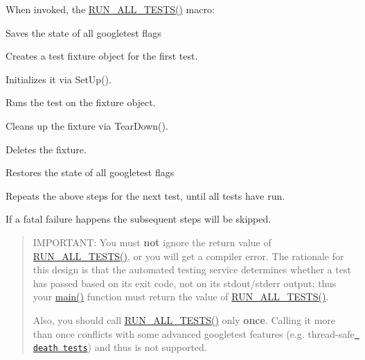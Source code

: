 When invoked, the {\ttfamily \mbox{\hyperlink{googletest-master_2googletest_2include_2gtest_2gtest_8h_a853a3792807489591d3d4a2f2ff9359f}{R\+U\+N\+\_\+\+A\+L\+L\+\_\+\+T\+E\+S\+T\+S()}}} macro\+:


\begin{DoxyEnumerate}
\item Saves the state of all googletest flags
\end{DoxyEnumerate}
\begin{DoxyItemize}
\item Creates a test fixture object for the first test.
\item Initializes it via {\ttfamily Set\+Up()}.
\item Runs the test on the fixture object.
\item Cleans up the fixture via {\ttfamily Tear\+Down()}.
\item Deletes the fixture.
\item Restores the state of all googletest flags
\item Repeats the above steps for the next test, until all tests have run.
\end{DoxyItemize}

If a fatal failure happens the subsequent steps will be skipped.

\begin{quote}
I\+M\+P\+O\+R\+T\+A\+NT\+: You must {\bfseries{not}} ignore the return value of {\ttfamily \mbox{\hyperlink{googletest-master_2googletest_2include_2gtest_2gtest_8h_a853a3792807489591d3d4a2f2ff9359f}{R\+U\+N\+\_\+\+A\+L\+L\+\_\+\+T\+E\+S\+T\+S()}}}, or you will get a compiler error. The rationale for this design is that the automated testing service determines whether a test has passed based on its exit code, not on its stdout/stderr output; thus your {\ttfamily \mbox{\hyperlink{_be_01vektoriaus_2main_8cpp_ae66f6b31b5ad750f1fe042a706a4e3d4}{main()}}} function must return the value of {\ttfamily \mbox{\hyperlink{googletest-master_2googletest_2include_2gtest_2gtest_8h_a853a3792807489591d3d4a2f2ff9359f}{R\+U\+N\+\_\+\+A\+L\+L\+\_\+\+T\+E\+S\+T\+S()}}}.

Also, you should call {\ttfamily \mbox{\hyperlink{googletest-master_2googletest_2include_2gtest_2gtest_8h_a853a3792807489591d3d4a2f2ff9359f}{R\+U\+N\+\_\+\+A\+L\+L\+\_\+\+T\+E\+S\+T\+S()}}} only {\bfseries{once}}. Calling it more than once conflicts with some advanced googletest features (e.\+g. thread-\/safe \href{advanced.md\#death-tests}{\texttt{ death tests}}) and thus is not supported. \end{quote}


